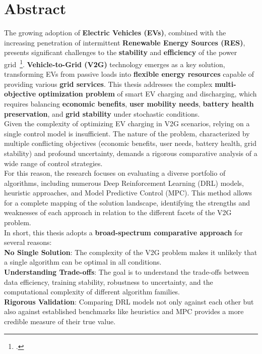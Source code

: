 \section*{Abstract}
The growing adoption of \textbf{Electric Vehicles (EVs)}, combined with the increasing penetration of intermittent \textbf{Renewable Energy Sources (RES)}, presents significant challenges to the \textbf{stability} and \textbf{efficiency} of the power grid~\footcite{Tavakoli2019}. \textbf{Vehicle-to-Grid (V2G)} technology emerges as a key solution, transforming EVs from passive loads into \textbf{flexible energy resources} capable of providing various \textbf{grid services}. This thesis addresses the complex \textbf{multi-objective optimization problem} of smart EV charging and discharging, which requires balancing \textbf{economic benefits}, \textbf{user mobility needs}, \textbf{battery health preservation}, and \textbf{grid stability} under stochastic conditions.
\\
Given the complexity of optimizing EV charging in V2G scenarios, relying on a single control model is insufficient. The nature of the problem, characterized by multiple conflicting objectives (economic benefits, user needs, battery health, grid stability) and profound uncertainty, demands a rigorous comparative analysis of a wide range of control strategies.
\\
For this reason, the research focuses on evaluating a diverse portfolio of algorithms, including numerous Deep Reinforcement Learning (DRL) models, heuristic approaches, and Model Predictive Control (MPC). This method allows for a complete mapping of the solution landscape, identifying the strengths and weaknesses of each approach in relation to the different facets of the V2G problem.
\\
In short, this thesis adopts a \textbf{broad-spectrum comparative approach} for several reasons:
\\
\textbf{No Single Solution}: The complexity of the V2G problem makes it unlikely that a single algorithm can be optimal in all conditions.
\\
\textbf{Understanding Trade-offs}: The goal is to understand the trade-offs between data efficiency, training stability, robustness to uncertainty, and the computational complexity of different algorithm families.
\\
\textbf{Rigorous Validation}: Comparing DRL models not only against each other but also against established benchmarks like heuristics and MPC provides a more credible measure of their true value.
\\


